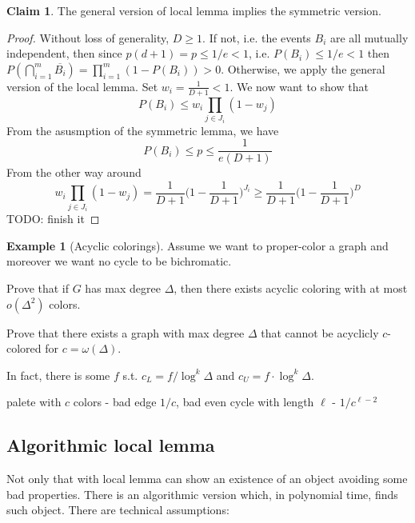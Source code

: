 \documentclass{article}
\theoremstyle{plain}
\theoremstyle{definition}
\newtheorem{prikl}[thm]{Example}
\newtheorem{tvrz}[thm]{Claim}
\begin{document}
\begin{tvrz}
	The general version of local lemma implies the symmetric version.
\end{tvrz}
\begin{proof}
	Without loss of generality, $D\geq 1$. If not, i.e. the events $B_i$ are all mutually independent, then since $p(d+1)=p\leq 1/e<1$, i.e. $P(B_i)\leq 1/e<1$ then $P(\bigcap_{i=1}^m\overline{B_i})=\prod_{i=1}^m(1-P(B_i))>0$. Otherwise, we apply the general version of the local lemma. Set $w_i=\frac{1}{D+1}<1$. We now want to show that $$
	P(B_i)\leq w_i\prod_{j\in J_i}(1-w_j)
	$$
	From the asusmption of the symmetric lemma, we have $$P(B_i)\leq p\leq \frac{1}{e(D+1)}$$ From the other way around
	$$
	w_i\prod_{j\in J_i}(1-w_j)=\frac{1}{D+1}\bigg(1-\frac{1}{D+1}\bigg)^{J_i}\geq \frac{1}{D+1}\bigg(1-\frac{1}{D+1}\bigg)^D
	$$ 
	TODO: finish it
	
	
	
\end{proof}

\begin{prikl}[Acyclic colorings]
	Assume we want to proper-color a graph and moreover we want no cycle to be bichromatic.
	
	Prove that if $G$ has max degree $\Delta$, then there exists acyclic coloring with at most $o(\Delta^2)$ colors.
	
	Prove that there exists a graph with max degree $\Delta$ that cannot be acyclicly $c$-colored for $c=\omega(\Delta)$.
	
	In fact, there is some $f$ s.t. $c_L=f/\log^k\Delta$ and $c_U=f\cdot \log^k\Delta$.
\end{prikl}
palete with $c$ colors - bad edge $1/c$, bad even cycle with length $\ell$ - $1/c^{\ell-2}$

\subsection{Algorithmic local lemma}
Not only that with local lemma can show an existence of an object avoiding some bad properties. There is an algorithmic version which, in polynomial time, finds such object. There are technical assumptions:
\end{document}
